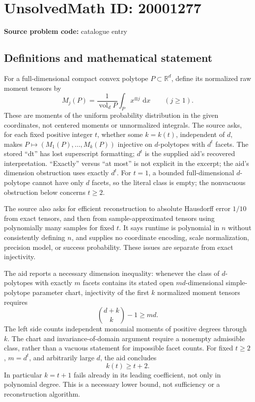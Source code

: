 \documentclass[11pt]{article}
\newcommand{\R}{\mathbb{R}}
\newcommand{\dd}{\,\mathrm{d}}
\begin{document}
\section*{UnsolvedMath ID: 20001277}
\textbf{Source problem code:} catalogue entry
\subsection{Definitions and mathematical statement}
For a full-dimensional compact convex polytope \(P\subset\R^d\), define its normalized raw moment tensors by
\[
 M_j(P)=\frac1{\operatorname{vol}_dP}\int_Px^{\otimes j}\,\dd x\qquad(j\ge1).
\]
These are moments of the uniform probability distribution in the given coordinates, not centered moments or unnormalized integrals. The source asks, for each fixed positive integer \(t\), whether some \(k=k(t)\), independent of \(d\), makes \(P\mapsto(M_1(P),\ldots,M_k(P))\) injective on \(d\)-polytopes with \(d^t\) facets. The stored ``dt'' has lost superscript formatting; \(d^t\) is the supplied aid's recovered interpretation. ``Exactly'' versus ``at most'' is not explicit in the excerpt; the aid's dimension obstruction uses exactly \(d^t\). For \(t=1\), a bounded full-dimensional \(d\)-polytope cannot have only \(d\) facets, so the literal class is empty; the nonvacuous obstruction below concerns \(t\ge2\).

The source also asks for efficient reconstruction to absolute Hausdorff error \(1/10\) from exact tensors, and then from sample-approximated tensors using polynomially many samples for fixed \(t\). It says runtime is polynomial in \(n\) without consistently defining \(n\), and supplies no coordinate encoding, scale normalization, precision model, or success probability. These issues are separate from exact injectivity.

The aid reports a necessary dimension inequality: whenever the class of \(d\)-polytopes with exactly \(m\) facets contains its stated open \(md\)-dimensional simple-polytope parameter chart, injectivity of the first \(k\) normalized moment tensors requires
\[
 \binom{d+k}{k}-1\ge md.
\]
The left side counts independent monomial moments of positive degrees through \(k\). The chart and invariance-of-domain argument require a nonempty admissible class, rather than a vacuous statement for impossible facet counts. For fixed \(t\ge2\), \(m=d^t\), and arbitrarily large \(d\), the aid concludes
\[
 k(t)\ge t+2.
\]
In particular \(k=t+1\) fails already in its leading coefficient, not only in polynomial degree. This is a necessary lower bound, not sufficiency or a reconstruction algorithm.
\end{document}
